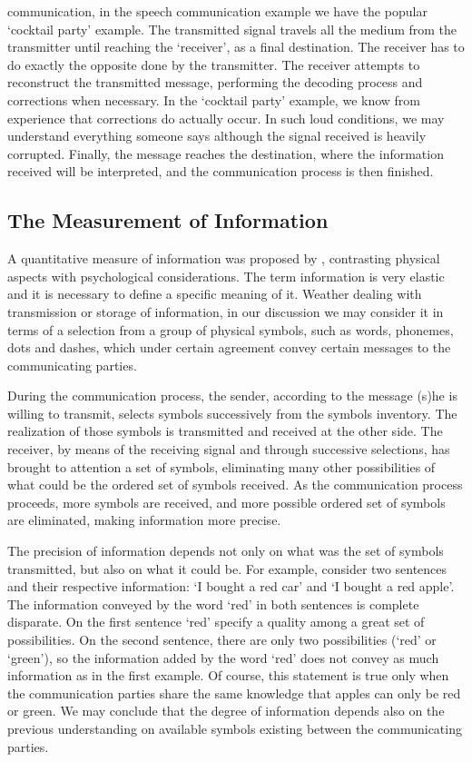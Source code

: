 communication, in the speech communication example we have the popular `cocktail party' example. 
The transmitted signal travels all the medium from the transmitter until reaching the `receiver', as a final destination. 
The receiver has to do exactly the opposite done by the transmitter. The receiver attempts to reconstruct the transmitted
message, performing the decoding process and corrections when necessary. In the `cocktail party' example, we know from 
experience that corrections do actually occur. In such loud conditions, we may understand everything someone says although 
the signal received is heavily corrupted. Finally, the message reaches the destination, where the information received will 
be interpreted, and the communication process is then finished.


\subsection{The Measurement of Information}
A quantitative measure of information was proposed by \citep{hartley1928}, contrasting physical aspects with 
psychological considerations. The term information is very elastic and it is necessary to define a specific 
meaning of it. Weather dealing with transmission or storage of information, in our discussion we may consider 
it in terms of a selection from a group of physical symbols, such as words, phonemes, dots and dashes, 
which under certain agreement convey certain messages to the communicating parties.

During the communication process, the sender, according to the message (s)he is willing to transmit, 
selects symbols successively from the symbols inventory. The realization of those symbols is transmitted and 
received at the other side. The receiver, by means of the receiving signal and through successive selections, 
has brought to attention a set of symbols, eliminating many other possibilities of what could be the ordered 
set of symbols received. As the communication process proceeds, more symbols are received, and more possible 
ordered set of symbols are eliminated, making information more precise.

The precision of information depends not only on what was the set of symbols transmitted, 
but also on what it could be. For example, consider two sentences and their respective information: 
`I bought a red car' and `I bought a red apple'. The information conveyed by the word `red' in both sentences 
is complete disparate. On the first sentence `red' specify a quality among a great set of possibilities. 
On the second sentence, there are only two possibilities (`red' or `green'), so the information added 
by the word `red' does not convey as much information as in the first example. 
Of course, this statement is true only when the communication parties share the same knowledge that 
apples can only be red or green. We may conclude that the degree of information depends also on the 
previous understanding on available symbols existing between the communicating parties.

